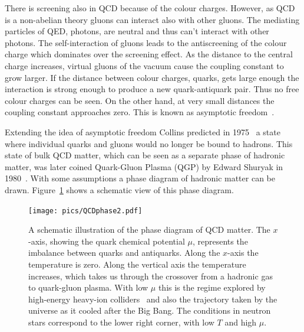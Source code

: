There is screening also in QCD because of the colour charges. However, as QCD is a non-abelian theory gluons can interact also with other gluons. The mediating particles of QED, photons, are neutral and thus can't interact with other photons. The self-interaction of gluons leads to the antiscreening of the colour charge which dominates over the screening effect. As the distance to the central charge increases, virtual gluons of the vacuum cause the coupling constant to grow larger. If the distance between colour charges, quarks, gets large enough the interaction is strong enough to produce a new quark-antiquark pair. Thus no free colour charges can be seen. On the other hand, at very small distances the coupling constant approaches zero. This is known as asymptotic freedom~\cite{Perkins:1982xb}.


Extending the idea of asymptotic freedom Collins predicted in 1975~\cite{Collins:1975} a state where individual quarks and gluons would no longer be bound to hadrons. This state of bulk QCD matter, which can be seen as a separate phase of hadronic matter, was later coined Quark-Gluon Plasma (QGP) by Edward Shuryak in 1980~\cite{Shuryak:1980}. With some assumptions a phase diagram of hadronic matter can be drawn. Figure~\ref{fig:QCDphase} shows a schematic view of this phase diagram.

\begin{figure}[htb]
\centering
\texttt{[image: pics/QCDphase2.pdf]}
\caption[QCD phase diagram]{A schematic illustration of the phase diagram of QCD matter. The $x$-axis, showing the quark chemical potential $\mu$, represents the imbalance between quarks and antiquarks. Along the $x$-axis the temperature is zero. Along the vertical axis the temperature increases, which takes us through the crossover from a hadronic gas to quark-gluon plasma. With low $\mu$ this is the regime explored by high-energy heavy-ion colliders~\cite{Rajagopal:2001} and also the trajectory taken by the universe as it cooled after the Big Bang. The conditions in neutron stars correspond to the lower right corner, with low $T$ and high $\mu$.}
\label{fig:QCDphase}
\end{figure}


